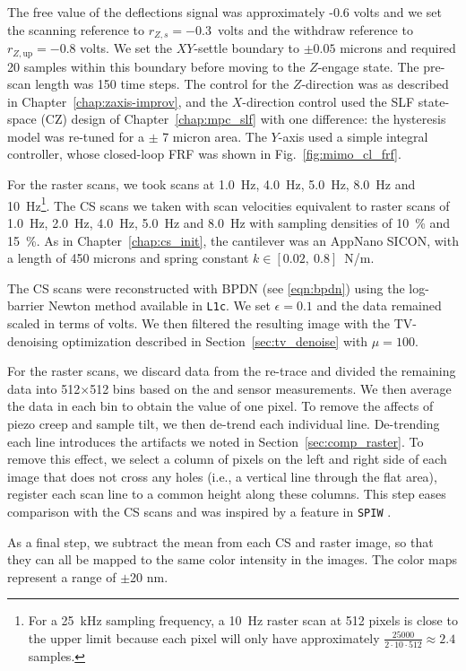 The free value of the deflections signal was approximately -0.6 volts and we set the scanning reference to $r_{Z,s}=-0.3$~volts and the withdraw reference to $r_{Z,\textrm{up}}=-0.8$ volts. We set the $XY$-settle boundary to $\pm 0.05$ microns and required 20 samples within this boundary before moving to the $Z$-engage state. The pre-scan length was 150 time steps. The control for the $Z$-direction was as described in Chapter~\ref{chap:zaxis-improv}, and the $X$-direction control used the SLF state-space (CZ) design of Chapter~\ref{chap:mpc_slf} with one difference: the hysteresis model was re-tuned for a $\pm$ 7 micron area. The $Y$-axis used a simple integral controller, whose closed-loop FRF was shown in Fig.~\ref{fig:mimo_cl_frf}.

For the raster scans, we took scans at 1.0~Hz, 4.0~Hz, 5.0~Hz, 8.0~Hz and 10~Hz\footnote{For a 25~kHz sampling frequency, a 10~Hz raster scan at 512 pixels is close to the upper limit because each pixel will only have approximately $ \frac{25000}{2\cdot 10 \cdot 512}\approx 2.4$ samples.}. The CS scans we taken with scan velocities equivalent to raster scans of 1.0~Hz, 2.0~Hz, 4.0~Hz, 5.0~Hz and 8.0~Hz with sampling densities of 10~\% and 15~\%. As in Chapter~\ref{chap:cs_init}, the cantilever was an AppNano SICON, with a length of 450 microns and spring constant $k\in[0.02,~0.8]$~N/m.

The CS scans were reconstructed with BPDN (see \eqref{eqn:bpdn}) using the log-barrier Newton method available in \texttt{L1c}\cite{L1c}. We set $\epsilon = 0.1$ and the data remained scaled in terms of volts. We then filtered the resulting image with the TV-denoising optimization described in Section~\ref{sec:tv_denoise} with $\mu=100$.

For the raster scans, we discard data from the re-trace and divided the remaining data into 512$\times$512 bins based on the \xc and \yc sensor measurements. We then average the data in each bin to obtain the value of one pixel. To remove the affects of piezo creep and sample tilt, we then de-trend each individual line. De-trending each line introduces the artifacts we noted in Section~\ref{sec:comp_raster}. To remove this effect, we select a column of pixels on the left and right side of each image that does not cross any holes (i.e., a vertical line through the flat area), register each scan line to a common height along these columns. This step eases comparison with the CS scans and was inspired by a feature in \texttt{SPIW} \cite{spiw}.

As a final step, we subtract the mean from each CS and raster image, so that they can all be mapped to the same color intensity in the images. The color maps represent a range of $\pm$20 nm.


